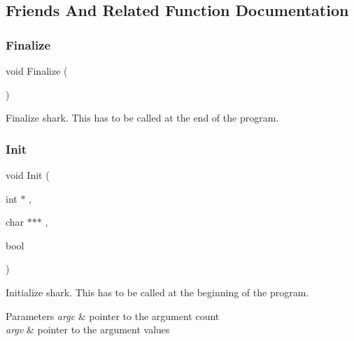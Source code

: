 \subsection{Friends And Related Function Documentation}
\hypertarget{classshark_1_1_group_a8fee61d7a783cade1a3d07fe86284d27}{}\label{classshark_1_1_group_a8fee61d7a783cade1a3d07fe86284d27} 
\subsubsection{\texorpdfstring{Finalize}{Finalize}}
{\footnotesize\ttfamily void Finalize (\begin{DoxyParamCaption}{ }\end{DoxyParamCaption})\hspace{0.3cm}{\ttfamily [friend]}}

Finalize shark. This has to be called at the end of the program. \hypertarget{classshark_1_1_group_adba66a23d3a48c8a7accb2e0f15ac133}{}\label{classshark_1_1_group_adba66a23d3a48c8a7accb2e0f15ac133} 
\subsubsection{\texorpdfstring{Init}{Init}}
{\footnotesize\ttfamily void Init (\begin{DoxyParamCaption}\item[{int $\ast$}]{,  }\item[{char $\ast$$\ast$$\ast$}]{,  }\item[{bool}]{ }\end{DoxyParamCaption})\hspace{0.3cm}{\ttfamily [friend]}}

Initialize shark. This has to be called at the beginning of the program. 
\begin{DoxyParams}{Parameters}
{\em argc} & pointer to the argument count \\
\hline
{\em argv} & pointer to the argument values \\
\hline
\end{DoxyParams}
\hypertarget{classshark_1_1_group_a95b2488d732a4032db62c7d423a36dfa}{}\label{classshark_1_1_group_a95b2488d732a4032db62c7d423a36dfa} 
